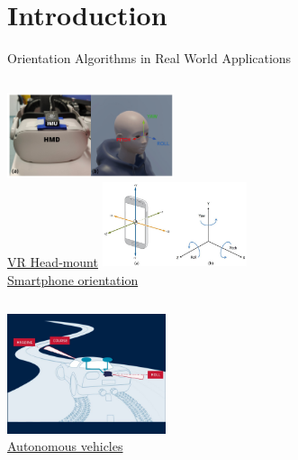 \documentclass[aspectratio=169,xcolor=dvipsnames]{beamer}
\begin{document}
\begin{frame}[plain]
  \titlepage
\end{frame}


\section{Introduction}


\begin{frame}{Orientation Algorithms in Real World Applications}
\tiny
\begin{columns}[T]
    \centering
    \includegraphics[height=2.5cm]{logos/a-Inertial-measurement-unit-IMU-placed-over-the-head-mounted-display-HMD-b.png} \\[0.3em]
    \href{https://www.mdpi.com/1424-8220/23/6/3077}{VR Head‐mount}
    \centering
    \includegraphics[height=2.5cm]{logos/smartphone.jpg} \\[0.3em]
    \href{https://www.mdpi.com/1424-8220/24/15/4769}{Smartphone orientation}
\end{columns}

\vspace{0.6em}

\begin{center}
  \includegraphics[height=3.5cm]{logos/autonomous.jpg} \\[0.3em]
  \href{https://www.sbg-systems.com/vehicles/self-driving-cars/}{Autonomous vehicles}
\end{center}
\end{frame}
\end{document}

